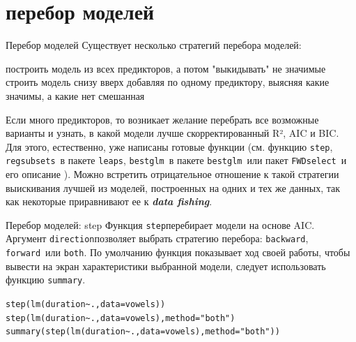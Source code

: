 \section{перебор моделей}
\begin{frame}{Перебор моделей}
Существует несколько стратегий перебора моделей:
\begin{itemize}
\mytem построить модель из всех предикторов, а потом "выкидывать" не значимые
\mytem строить модель снизу вверх добавляя по одному предиктору, выясняя какие значимы, а какие нет
\mytem смешанная
\end{itemize}
\vfill
Если много предикторов, то возникает желание перебрать все возможные варианты и узнать, в какой модели лучше скорректированный R², AIC и BIC. Для этого, естественно, уже написаны готовые функции (см. функцию \scriptsize\verb"step"\normalsize, \scriptsize\verb"regsubsets"\normalsize\ в пакете \scriptsize\verb"leaps"\normalsize, \scriptsize\verb"bestglm"\normalsize\ в пакете \scriptsize\verb"bestglm"\normalsize\ или пакет \scriptsize\verb"FWDselect"\normalsize\  и его описание \citep{sestelo2016}). Можно встретить отрицательное отношение к такой стратегии выискивания лучшей из моделей, построенных на одних и тех же данных, так как некоторые приравнивают ее к \textbf{\textit{data fishing}}.
\end{frame}
\begin{frame}{Перебор моделей: step}
Функция \scriptsize\verb"step"\normalsize перебирает модели на основе AIC. Аргумент \scriptsize\verb"direction"\normalsize позволяет выбрать стратегию перебора: \scriptsize\verb"backward"\normalsize, \scriptsize\verb"forward"\normalsize\ или \scriptsize\verb"both"\normalsize. По умолчанию функция показывает ход своей работы, чтобы вывести на экран характеристики выбранной модели, следует использовать функцию \scriptsize\verb"summary"\normalsize.
\vfill
\scriptsize
\begin{alltt}
step(lm(duration\textasciitilde., data = vowels))\\
step(lm(duration\textasciitilde., data = vowels), method = "both")\\
summary(step(lm(duration\textasciitilde., data = vowels), method = "both"))
\end{alltt}
\normalsize
\end{frame}
